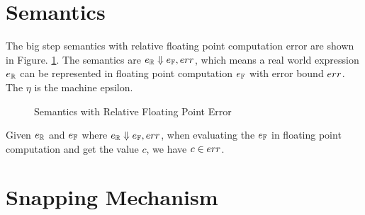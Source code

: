 \documentclass[a4paper,11pt]{article}
\begin{document}
\section{Semantics}

The big step semantics with relative floating point computation error are shown in Figure. \ref{fig_semantics_rel}. The semantics are $e_{\mathbb{R}} \Downarrow e_{\mathbb{F}}, err$, which means a real world expression $e_{\mathbb{R}}$ can be represented in floating point computation $e_{\mathbb{F}}$ with error bound $err$. The $\eta$ is the machine epsilon.

\begin{figure}
\caption{Semantics with Relative Floating Point Error}
\label{fig_semantics_rel}
\end{figure}


\begin{thm}
Given $e_{\mathbb{R}}$ and $e_{\mathbb{F}}$ where  $e_{\mathbb{R}} \Downarrow e_{\mathbb{F}}, err$, when evaluating the $e_{\mathbb{F}}$ in floating point computation and get the value $c$, we have $c \in err$.
\end{thm}




\section{Snapping Mechanism}
\end{document}
